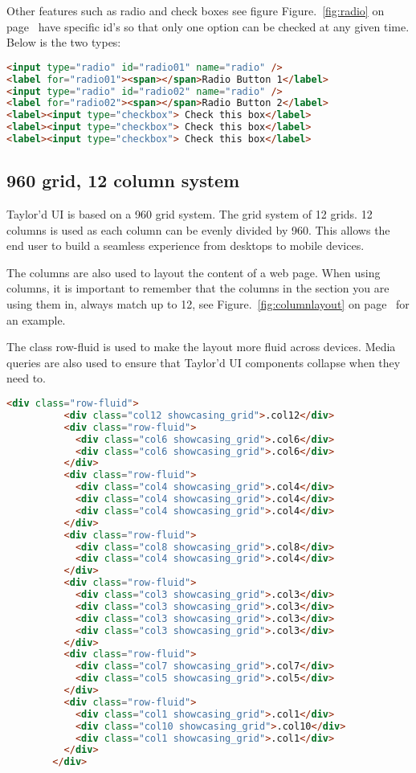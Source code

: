 Other features such as radio and check boxes see figure Figure.~\ref{fig:radio} on  page~\pageref{fig:radio} have specific id's so that only one option can be checked at any given time. Below is the two types: 

\begin{lstlisting}[language=HTML]
<input type="radio" id="radio01" name="radio" />
<label for="radio01"><span></span>Radio Button 1</label>
<input type="radio" id="radio02" name="radio" />
<label for="radio02"><span></span>Radio Button 2</label>
<label><input type="checkbox"> Check this box</label>
<label><input type="checkbox"> Check this box</label>
<label><input type="checkbox"> Check this box</label>
\end{lstlisting}


\newpage
\subsection*{960 grid, 12 column system}
Taylor'd UI is based on a 960 grid system. The grid system of 12 grids. 12 columns is used as each column can be evenly divided by 960. This allows the end user to build a seamless experience from desktops to mobile devices.

The columns are also used to layout the content of a web page. When using columns, it is important to remember that the columns in the section you are using them in, always match up to 12, see Figure.~\ref{fig:columnlayout} on  page~\pageref{fig:columnlayout} for an example. 

The class row-fluid is used to make the layout more fluid across devices. Media queries are also used to ensure that Taylor'd UI components collapse when they need to. 

\begin{lstlisting}[language=HTML]
<div class="row-fluid">
          <div class="col12 showcasing_grid">.col12</div>
          <div class="row-fluid">
            <div class="col6 showcasing_grid">.col6</div>
            <div class="col6 showcasing_grid">.col6</div>
          </div>
          <div class="row-fluid">
            <div class="col4 showcasing_grid">.col4</div>
            <div class="col4 showcasing_grid">.col4</div>
            <div class="col4 showcasing_grid">.col4</div>
          </div>
          <div class="row-fluid">
            <div class="col8 showcasing_grid">.col8</div>
            <div class="col4 showcasing_grid">.col4</div>
          </div>
          <div class="row-fluid">
            <div class="col3 showcasing_grid">.col3</div>
            <div class="col3 showcasing_grid">.col3</div>
            <div class="col3 showcasing_grid">.col3</div>
            <div class="col3 showcasing_grid">.col3</div>
          </div>
          <div class="row-fluid">
            <div class="col7 showcasing_grid">.col7</div>
            <div class="col5 showcasing_grid">.col5</div>
          </div>
          <div class="row-fluid">
            <div class="col1 showcasing_grid">.col1</div>
            <div class="col10 showcasing_grid">.col10</div>
            <div class="col1 showcasing_grid">.col1</div>
          </div>
        </div>
\end{lstlisting}

